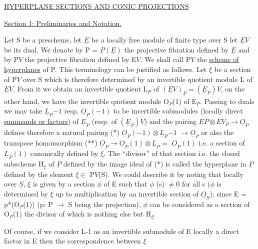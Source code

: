 
\uline{HYPERPLANE SECTIONS AND CONIC PROJECTIONS}

\uline{Section 1: Preliminaries and Notation.}

Let S be a prescheme, let $\underline{E}$ be a locally free module of
finite type over S let $\underline{E}V$ be its dual. We denote by P = $\underline{P}(\underline{E})$ the
projective fibration defined by $\underline{E}$ and by P$V$ the projective
fibration defined by E$V$. We shall call P$V$ the \uline{scheme of}
\uline{hyperplanes} of P. This terminology can be justified as follows.
Let $\xi$ be a section of P$V$ over S which is therefore determined by an
invertible quotient module L of $\underline{E}V$. From it we obtain an
invertible quotient L$_{P}$ of $(\underline{E}V)_{\underline{P}} = (\underline{E}_{P})V$, on the other hand, we have
the invertible quotient module O$_{P}$(1) of E$_{P}$. Passing to duals we
may take $\underline{L}_{P}{-1}$ resp. $\underline{O}_{P}(-1)$ to be invertible submodules (locally
direct \uline{summands or factors}) of $\underline{E}_{P}$ (resp. of $(\underline{E}_{P})V$) and the pairing
$EP \otimes EV_{P} \to \underline{O}_{P}$ defines therefore a natural pairing (*) $\underline{O}_{P}(-1) \otimes \underline{L}_{P}{-1}$
$\to \underline{O}_{P}$ or also the transpose homomorphism (**) $\underline{O}_{P} \to \underline{O}_{P}(1) \otimes \underline{L}_{P} =$
$\underline{O}_{P}(1)$ i.e. a section of $\underline{L}_{P}(1)$ canonically defined by $\xi$. The
``divisor'' of that section i.e. the closed subscheme H$_{\xi}$ of $\underline{P}$ defined
by the image ideal of (*) is called the hyperplane in $\underline{P}$ defined by
the element $\xi \in$ P$V$(S). We could describe it by noting that locally
over $\underline{S}$, $\xi$ is given by a section $\phi$ of E such that $\phi$ (s) $\neq 0$ for all
s ($\phi$ is determined by $\xi$ up to multiplication by an invertible
section of $\underline{O}_{S}$); since E = p*(O$_{P}$(1)) (p: P $\to$ S being the
projection), $\phi$ can be considered as a section of O$_{P}$(1) the divisor
of which is nothing else but H$_{\xi}$.

Of course, if we consider L-1 as an invertible submodule of E
locally a direct factor in E then the correspondence between $\xi$
